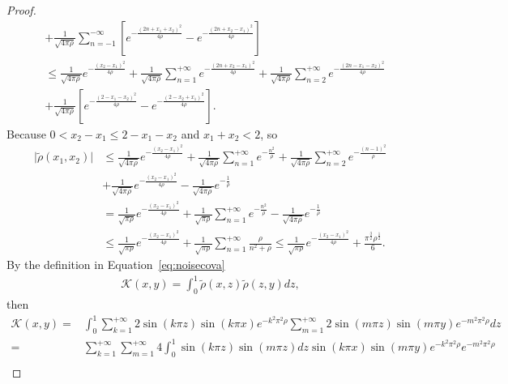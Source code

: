 \documentclass[11pt]{article}
\numberwithin{equation}{section}%
\numberwithin{figure}{section}%
\theoremstyle{remark}
\begin{document}
\begin{proof}
\begin{align*}
			&+\frac{1}{\sqrt{4\pi\rho}}\sum_{n=-1}^{-\infty}\left[e^{-\frac{(2n+x_{1}+x_{2})^{2}}{4\rho}}-e^{-\frac{(2n+x_{2}-x_{1})^{2}}{4\rho}}\right]\\
			&\leq \frac{1}{\sqrt{4\pi\rho}}e^{-\frac{(x_{2}-x_{1})^{2}}{4\rho}}+\frac{1}{\sqrt{4\pi\rho}}\sum_{n=1}^{+\infty}e^{-\frac{(2n+x_{2}-x_{1})^{2}}{4\rho}}+\frac{1}{\sqrt{4\pi\rho}}\sum_{n=2}^{+\infty}e^{-\frac{(2n-x_{1}-x_{2})^{2}}{4\rho}}\\
			&+\frac{1}{\sqrt{4\pi\rho}}\left[e^{-\frac{(2-x_{1}-x_{2})^{2}}{4\rho}}-e^{-\frac{(2-x_{2}+x_{1})^{2}}{4\rho}}\right].
		\end{align*}
		Because $0<x_{2}-x_{1}\leq 2-x_{1}-x_{2}$ and $x_{1}+x_{2}<2$, so
		\begin{equation}\label{eq:rhoest}
			\begin{split}
				\vert \tilde{\rho}(x_{1},x_{2})\vert
				&\leq \frac{1}{\sqrt{4\pi\rho}}e^{-\frac{(x_{2}-x_{1})^{2}}{4\rho}}+\frac{1}{\sqrt{4\pi\rho}}\sum_{n=1}^{+\infty}e^{-\frac{n^{2}}{\rho}}+\frac{1}{\sqrt{4\pi\rho}}\sum_{n=2}^{+\infty}e^{-\frac{(n-1)^{2}}{\rho}}\\
				&+\frac{1}{\sqrt{4\pi\rho}}e^{-\frac{(x_{2}-x_{1})^{2}}{4\rho}}-\frac{1}{\sqrt{4\pi\rho}}e^{-\frac{1}{\rho}}\\
				&=\frac{1}{\sqrt{\pi\rho}}e^{-\frac{(x_{2}-x_{1})^{2}}{4\rho}}+\frac{1}{\sqrt{\pi\rho}}\sum_{n=1}^{+\infty}e^{-\frac{n^{2}}{\rho}}-\frac{1}{\sqrt{4\pi\rho}}e^{-\frac{1}{\rho}}\\
				&\leq\frac{1}{\sqrt{\pi\rho}}e^{-\frac{(x_{2}-x_{1})^{2}}{4\rho}}+\frac{1}{\sqrt{\pi\rho}}\sum_{n=1}^{+\infty}\frac{\rho}{n^{2}+\rho}\leq \frac{1}{\sqrt{\pi\rho}}e^{-\frac{(x_{2}-x_{1})^{2}}{4\rho}}+\frac{\pi^{\frac{3}{2}}\rho^{\frac{1}{2}}}{6}.
			\end{split}
		\end{equation}
	By the definition in Equation~\eqref{eq:noisecova}~
		\begin{align*}
			\mathcal{K}(x,y)=\int_{0}^{1}\tilde{\rho}(x,z)\tilde{\rho}(z,y)dz,
		\end{align*}
		then
		\begin{equation}\label{eq:cova}
			\begin{split}
				\mathcal{K}(x,y)=&\int_{0}^{1}\sum_{k=1}^{+\infty}2\sin(k\pi z) \sin(k\pi x)e^{-k^{2}\pi^{2}\rho}\sum_{m=1}^{+\infty}2\sin(m\pi z) \sin(m\pi y)e^{-m^{2}\pi^{2}\rho}dz\\
				=&\sum_{k=1}^{+\infty}\sum_{m=1}^{+\infty}4\int_{0}^{1}\sin(k\pi z) \sin(m\pi z)dz\sin(k\pi x) \sin(m\pi y)e^{-k^{2}\pi^{2}\rho}e^{-m^{2}\pi^{2}\rho}\\

\end{split}
\end{equation}
\end{proof}
\end{document}
